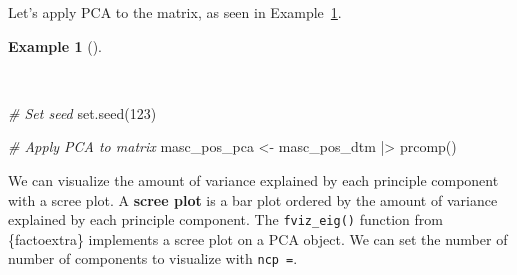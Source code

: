 \documentclass[
  letterpaper,
  krantz1]{latex/krantz-mod}
\newenvironment{Shaded}{\begin{snugshade}}{\end{snugshade}}
\newcommand{\CommentTok}[1]{\textcolor[rgb]{0.00,0.00,0.00}{\textit{#1}}}
\newcommand{\DecValTok}[1]{\textcolor[rgb]{0.00,0.00,0.00}{#1}}
\newcommand{\FunctionTok}[1]{\textcolor[rgb]{0.00,0.00,0.00}{#1}}
\newcommand{\NormalTok}[1]{\textcolor[rgb]{0.00,0.00,0.00}{#1}}
\newcommand{\OtherTok}[1]{\textcolor[rgb]{0.00,0.00,0.00}{#1}}
\newcommand{\SpecialCharTok}[1]{\textcolor[rgb]{0.00,0.00,0.00}{#1}}
\theoremstyle{definition}
\newtheorem{example}{Example}[chapter]
\theoremstyle{definition}
\theoremstyle{remark}
\begin{document}
Let's apply PCA to the matrix, as seen in
Example~\ref{exm-explore-masc-dtms-pca}.

\begin{example}[]\protect\hypertarget{exm-explore-masc-dtms-pca}{}\label{exm-explore-masc-dtms-pca}

~

\begin{Shaded}
\begin{Highlighting}[numbers=left,,]
\CommentTok{\# Set seed}
\FunctionTok{set.seed}\NormalTok{(}\DecValTok{123}\NormalTok{)}

\CommentTok{\# Apply PCA to matrix}
\NormalTok{masc\_pos\_pca }\OtherTok{\textless{}{-}}
\NormalTok{  masc\_pos\_dtm }\SpecialCharTok{|\textgreater{}}
  \FunctionTok{prcomp}\NormalTok{()}
\end{Highlighting}
\end{Shaded}

\end{example}

We can visualize the amount of variance explained by each principle
component with a scree plot. A \textbf{scree plot} is a bar plot ordered
by the amount of variance explained by each principle component. The
\texttt{fviz\_eig()} function from \{factoextra\} implements a scree
plot on a PCA object. We can set the number of number of components to
visualize with \texttt{ncp\ =}.
\end{document}
